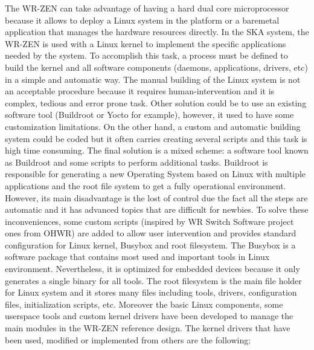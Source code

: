 The WR-ZEN can take advantage of having a hard dual core microprocessor because it allows to deploy a Linux system in the platform or a baremetal application that manages the hardware resources directly. In the SKA system, the WR-ZEN is used with a Linux kernel to implement the specific applications needed by the system. To accomplish this task, a process must be defined to build the kernel and all software components (daemons, applications, drivers, etc) in a simple and automatic way. The manual building of the Linux system is not an acceptable procedure because it requires human-intervention and it is complex, tedious and error prone task. Other solution could be to use an existing software tool (Buildroot or Yocto for example), however, it used to have some customization limitations. On the other hand, a custom and automatic building system could be coded but it often carries creating several scripts and this task is high time consuming. The final solution is a mixed scheme: a software tool known as Buildroot and some scripts to perform additional tasks. Buildroot is responsible for generating a new Operating System based on Linux with multiple applications and the root file system to get a fully operational environment. However, its main disadvantage is the lost of control due the fact all the steps are automatic and it has advanced topics that are difficult for newbies. To solve these inconveniences, some custom scripts (inspired by WR Switch Software project ones from OHWR) are added to allow user intervention and provides standard configuration for Linux kernel, Busybox and root filesystem. The Busybox is a software package that contains most used and important tools in Linux environment. Nevertheless, it is optimized for embedded devices because it only generates a single binary for all tools. The root filesystem is the main file holder for Linux system and it stores many files including tools, drivers, configuration files, initialization scripts, etc. Moreover the basic Linux components, some userspace tools and custom kernel drivers have been developed to manage the main modules in the WR-ZEN reference design. The kernel drivers that have been used, modified or implemented from others are the following:


